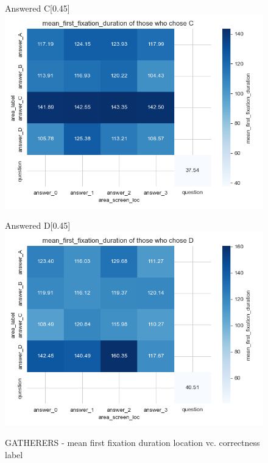 \documentclass{article}
\begin{document}
\begin{figure}[H]
  \vspace{1em} %

  \begin{subcaptionbox}{Answered C\label{fig:C_ff_g}}[0.45\textwidth]
    {\centering\includegraphics[width=\linewidth]{plots/matrix_plots/matrix_mean_first_fixation_duration_C_gatherers.png}}
  \end{subcaptionbox}
  \hfill
  \begin{subcaptionbox}{Answered D\label{fig:D_ff_g}}[0.45\textwidth]
    {\centering\includegraphics[width=\linewidth]{plots/matrix_plots/matrix_mean_first_fixation_duration_D_gatherers.png}}
  \end{subcaptionbox}
  
  \caption{GATHERERS - mean first fixation duration location vc. correctness label}
  \label{fig:fourimages6}
\end{figure}
\end{document}
